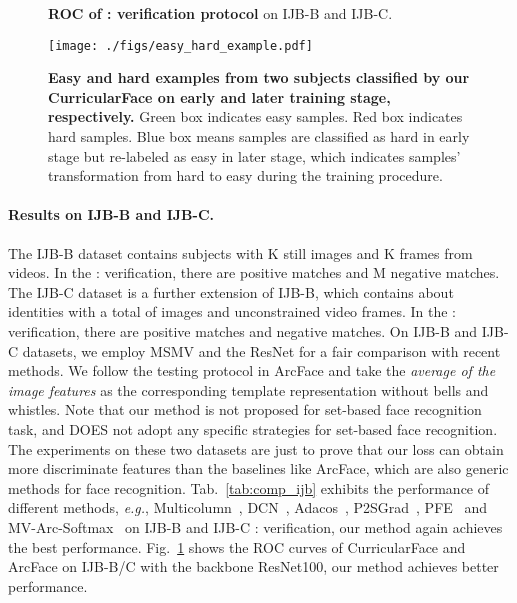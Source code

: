 \documentclass[10pt,twocolumn,letterpaper]{article}
\def\figvspace{{\vspace{-2mm}}}
\begin{document}
\begin{figure}[t]
\centering
{}\centering
\caption{\small \textbf{ROC of : verification protocol} on IJB-B and IJB-C.
}
 \label{fig:ijb_roc}
\end{figure}


\begin{figure*}[t]
  \centering
  \texttt{[image: ./figs/easy\_hard\_example.pdf]}
  \caption{\small \textbf{Easy and hard examples from two subjects classified by our CurricularFace on early and later training stage, respectively.}
  Green box indicates easy samples.
  Red box indicates hard samples.
  Blue box means samples are classified as hard in early stage but re-labeled as easy in later stage, which indicates samples' transformation from hard to easy during the training procedure.
  }
  \label{fig:easy_hard_example}
  \figvspace
\end{figure*}

\vspace{-2mm}
\paragraph{Results on IJB-B and IJB-C.}
The IJB-B dataset contains  subjects with K still images and K frames from  videos. In the : verification, there are  positive matches and M negative matches.
The IJB-C dataset is a further extension of IJB-B, which contains about  identities with a total of  images and  unconstrained video frames.
In the : verification, there are  positive matches and  negative matches.
On IJB-B and IJB-C datasets, we employ MSMV and the ResNet for a fair comparison with recent methods. We follow the testing protocol in ArcFace and take the \textit{average of the image features} as the corresponding template representation without bells and whistles. Note that our method is not proposed for set-based face recognition task, and
DOES not adopt any specific strategies for set-based face recognition. The experiments on these two datasets are just to prove that our loss can obtain more discriminate features than the baselines like ArcFace, which are also generic methods for face recognition.
Tab.~\ref{tab:comp_ijb} exhibits the performance of different methods, \textit{e.g.}, Multicolumn~\cite{xie2018multicolumn}, DCN~\cite{xie2018comparator}, Adacos~\cite{zhang2019adacos}, P2SGrad~\cite{zhang2019p2sgrad}, PFE~\cite{shi2019probabilistic} and MV-Arc-Softmax~\cite{wang2018support} on IJB-B and IJB-C : verification,
our method again achieves the best performance. Fig.~\ref{fig:ijb_roc} shows the ROC curves of CurricularFace and ArcFace on IJB-B/C with the backbone ResNet100, our method achieves better performance.
\end{document}
